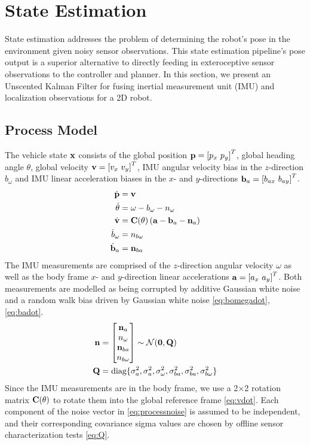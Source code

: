 \section{State Estimation}
\label{sec:state_estimation}

State estimation addresses the problem of determining the robot's pose in the environment given noisy sensor observations.
This state estimation pipeline's pose output is a superior alternative to directly feeding in exteroceptive sensor observations to the controller and planner.
In this section, we present an Unscented Kalman Filter for fusing inertial measurement unit (IMU) and localization observations for a 2D robot.

\subsection{Process Model}
The vehicle state $\mathbf{x}$ consists of the global position $\mbf{p} = \left[ p_x \ p_y \right]^T$, global heading angle $\theta$, global velocity $\mathbf{v} = \left[ v_x \ v_y \right]^T$, IMU angular velocity bias in the $z$-direction $b_\omega$ and IMU linear acceleration biases in the $x$- and $y$-directions $\mathbf{b}_a = \left[ b_{ax} \ b_{ay} \right]^T$.
%
\begin{align}
  \dot{\mbf{p}} &= \mbf{v} \\
  \dot{\theta} &= \omega - b_\omega - n_\omega \\
 \dot{\mbf{v}} &= \mbf{C}(\theta) \left( \mbf{a} - \mbf{b}_a - \mbf{n}_a \right) \label{eq:vdot} \\
\dot{b}_\omega &= n_{b\omega} \label{eq:bomegadot} \\
  \dot{\mbf{b}}_a &= \mbf{n}_{ba} \label{eq:badot}
\end{align}
%
The IMU measurements are comprised of the $z$-direction angular velocity $\omega$ as well as the body frame $x$- and $y$-direction linear accelerations $\mbf{a} = \left[ a_x \ a_y \right]^T$.
Both measurements are modelled as being corrupted by additive Gaussian white noise and a random walk bias driven by Gaussian white noise \eqref{eq:bomegadot}, \eqref{eq:badot}.
\begin{align}
  \mbf{n} &= \bbm \mbf{n}_a \\ n_\omega \\ \mbf{n}_{ba} \\ n_{b\omega} \ebm \sim \mathcal{N}(\mbf{0}, \mbf{Q}) \label{eq:processnoise} \\
  \mbf{Q} &= \text{diag}\{ \sigma_a^2, \sigma_a^2, \sigma_\omega^2, \sigma_{ba}^2, \sigma_{ba}^2, \sigma_{b\omega}^2 \} \label{eq:Q}
\end{align}
Since the IMU measurements are in the body frame, we use a 2$\times$2 rotation matrix $\mathbf{C}(\theta)$ to rotate them into the global reference frame \eqref{eq:vdot}.
Each component of the noise vector in \eqref{eq:processnoise} is assumed to be independent, and their corresponding covariance sigma values are chosen by offline sensor characterization tests \eqref{eq:Q}.

